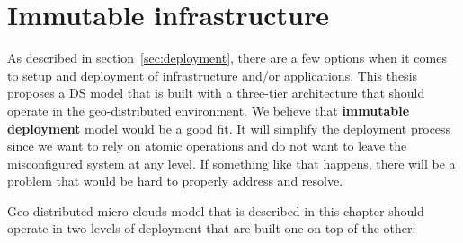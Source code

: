 \section{Immutable infrastructure}\label{sec:immutable_infrastructure}
%
As described in section~\ref{sec:deployment}, there are a few options when it comes to setup and deployment of infrastructure and/or applications. This thesis proposes a DS model that is built with a three-tier architecture that should operate in the geo-distributed environment. We believe that \textbf{immutable deployment} model would be a good fit. It will simplify the deployment process since we want to rely on atomic operations and do not want to leave the misconfigured system at any level. If something like that happens, there will be a problem that would be hard to properly address and resolve.

Geo-distributed micro-clouds model that is described in this chapter should operate in two levels of deployment that are built one on top of the other:

